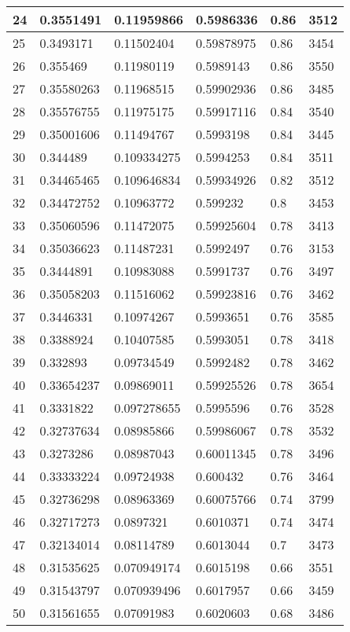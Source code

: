 \begin{longtable}{|l|l|l|l|l|l|}
24 & 0.3551491 & 0.11959866 & 0.5986336 & 0.86 & 3512 \\ \hline 
25 & 0.3493171 & 0.11502404 & 0.59878975 & 0.86 & 3454 \\ \hline 
26 & 0.355469 & 0.11980119 & 0.5989143 & 0.86 & 3550 \\ \hline 
27 & 0.35580263 & 0.11968515 & 0.59902936 & 0.86 & 3485 \\ \hline 
28 & 0.35576755 & 0.11975175 & 0.59917116 & 0.84 & 3540 \\ \hline 
29 & 0.35001606 & 0.11494767 & 0.5993198 & 0.84 & 3445 \\ \hline 
30 & 0.344489 & 0.109334275 & 0.5994253 & 0.84 & 3511 \\ \hline 
31 & 0.34465465 & 0.109646834 & 0.59934926 & 0.82 & 3512 \\ \hline 
32 & 0.34472752 & 0.10963772 & 0.599232 & 0.8 & 3453 \\ \hline 
33 & 0.35060596 & 0.11472075 & 0.59925604 & 0.78 & 3413 \\ \hline 
34 & 0.35036623 & 0.11487231 & 0.5992497 & 0.76 & 3153 \\ \hline 
35 & 0.3444891 & 0.10983088 & 0.5991737 & 0.76 & 3497 \\ \hline 
36 & 0.35058203 & 0.11516062 & 0.59923816 & 0.76 & 3462 \\ \hline 
37 & 0.3446331 & 0.10974267 & 0.5993651 & 0.76 & 3585 \\ \hline 
38 & 0.3388924 & 0.10407585 & 0.5993051 & 0.78 & 3418 \\ \hline 
39 & 0.332893 & 0.09734549 & 0.5992482 & 0.78 & 3462 \\ \hline 
40 & 0.33654237 & 0.09869011 & 0.59925526 & 0.78 & 3654 \\ \hline 
41 & 0.3331822 & 0.097278655 & 0.5995596 & 0.76 & 3528 \\ \hline 
42 & 0.32737634 & 0.08985866 & 0.59986067 & 0.78 & 3532 \\ \hline 
43 & 0.3273286 & 0.08987043 & 0.60011345 & 0.78 & 3496 \\ \hline 
44 & 0.33333224 & 0.09724938 & 0.600432 & 0.76 & 3464 \\ \hline 
45 & 0.32736298 & 0.08963369 & 0.60075766 & 0.74 & 3799 \\ \hline 
46 & 0.32717273 & 0.0897321 & 0.6010371 & 0.74 & 3474 \\ \hline 
47 & 0.32134014 & 0.08114789 & 0.6013044 & 0.7 & 3473 \\ \hline 
48 & 0.31535625 & 0.070949174 & 0.6015198 & 0.66 & 3551 \\ \hline 
49 & 0.31543797 & 0.070939496 & 0.6017957 & 0.66 & 3459 \\ \hline 
50 & 0.31561655 & 0.07091983 & 0.6020603 & 0.68 & 3486 \\ \hline 
\end{longtable}